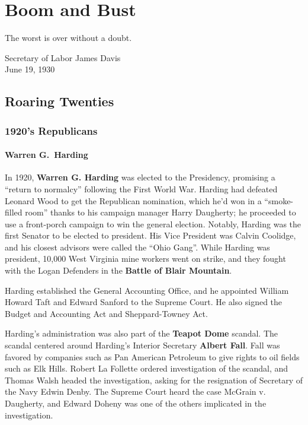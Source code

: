 \chapter{Boom and Bust}

\epigraph{%
  The worst is over without a doubt.
}{Secretary of Labor James Davis \\ June 19, 1930}

\section{Roaring Twenties}

\subsection*{1920's Republicans}

\subsubsection*{Warren G.\ Harding}

In 1920, \textbf{Warren G. Harding} was elected to the Presidency,
promising a ``return to normalcy'' following the First World War.
Harding had defeated Leonard Wood to get the Republican nomination,
which he'd won in a ``smoke-filled room'' thanks to his campaign manager Harry Daugherty;
he proceeded to use a front-porch campaign to win the general election.
Notably, Harding was the first Senator to be elected to president.
His Vice President was Calvin Coolidge, and his closest advisors were called the ``Ohio Gang''.
While Harding was president, 10,000 West Virginia mine workers went on strike,
and they fought with the Logan Defenders in the \textbf{Battle of Blair Mountain}.

Harding established the General Accounting Office,
and he appointed William Howard Taft and Edward Sanford to the Supreme Court.
He also signed the Budget and Accounting Act and Sheppard-Towney Act.

Harding's administration was also part of the \textbf{Teapot Dome} scandal.
The scandal centered around Harding's Interior Secretary \textbf{Albert Fall}.
Fall was favored by companies such as Pan American Petroleum
to give rights to oil fields such as Elk Hills.
Robert La Follette ordered investigation of the scandal,
and Thomas Walsh headed the investigation,
asking for the resignation of Secretary of the Navy Edwin Denby.
The Supreme Court heard the case McGrain v. Daugherty,
and Edward Doheny was one of the others implicated in the investigation.

